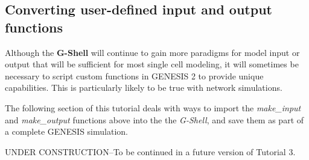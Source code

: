 \documentclass[12pt]{article}
\begin{document}
\subsection*{Converting user-defined input and output functions}

Although the {\bf G-Shell} will continue to gain more paradigms for model
input or output that will be sufficient for most single cell modeling,
it will sometimes be necessary to script custom functions in GENESIS 2
to provide unique capabilities.  This is particularly likely to be
true with network simulations.

The following section of this tutorial deals with ways to import the {\it make\_input} and
{\it make\_output} functions above into the the {\it G-Shell}, and save them as part
of a complete GENESIS simulation.

\noindent UNDER CONSTRUCTION--To be continued in a future version of Tutorial 3.
\end{document}
